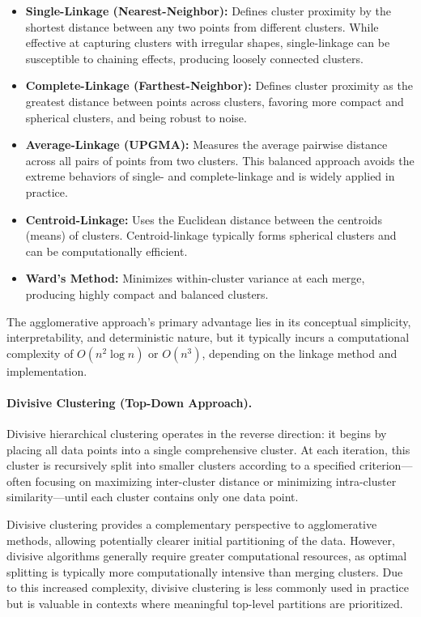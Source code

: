 \begin{itemize}
    \item \textbf{Single-Linkage (Nearest-Neighbor):} Defines cluster proximity by the shortest distance between any two points from different clusters. While effective at capturing clusters with irregular shapes, single-linkage can be susceptible to chaining effects, producing loosely connected clusters.
    \item \textbf{Complete-Linkage (Farthest-Neighbor):} Defines cluster proximity as the greatest distance between points across clusters, favoring more compact and spherical clusters, and being robust to noise.
    \item \textbf{Average-Linkage (UPGMA):} Measures the average pairwise distance across all pairs of points from two clusters. This balanced approach avoids the extreme behaviors of single- and complete-linkage and is widely applied in practice.
    \item \textbf{Centroid-Linkage:} Uses the Euclidean distance between the centroids (means) of clusters. Centroid-linkage typically forms spherical clusters and can be computationally efficient.
    \item \textbf{Ward’s Method:} Minimizes within-cluster variance at each merge, producing highly compact and balanced clusters.
\end{itemize}

The agglomerative approach's primary advantage lies in its conceptual simplicity, interpretability, and deterministic nature, but it typically incurs a computational complexity of \(O(n^2\log n)\) or \(O(n^3)\), depending on the linkage method and implementation.

\paragraph{Divisive Clustering (Top-Down Approach).}
Divisive hierarchical clustering operates in the reverse direction: it begins by placing all data points into a single comprehensive cluster. At each iteration, this cluster is recursively split into smaller clusters according to a specified criterion—often focusing on maximizing inter-cluster distance or minimizing intra-cluster similarity—until each cluster contains only one data point. 

Divisive clustering provides a complementary perspective to agglomerative methods, allowing potentially clearer initial partitioning of the data. However, divisive algorithms generally require greater computational resources, as optimal splitting is typically more computationally intensive than merging clusters. Due to this increased complexity, divisive clustering is less commonly used in practice but is valuable in contexts where meaningful top-level partitions are prioritized.


